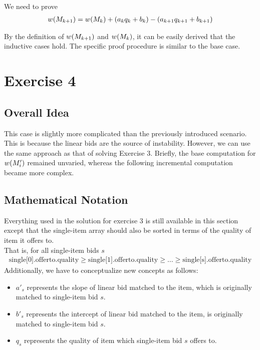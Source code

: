 \documentclass[11pt,a4paper]{article}
\begin{document}
We need to prove
\begin{align*}
    w(M_{k+1}) = w(M_{k}) + (a_{k} q_{k} + b_{k}) - (a_{k+1} q_{k+1} + b_{k+1})
\end{align*}

By the definition of $w(M_{k+1})$ and $w(M_{k})$, it can be easily derived that
the inductive cases hold. The specific proof procedure is similar to the base
case. 

\newpage
\section{Exercise 4}
\subsection{Overall Idea}
This case is slightly more complicated than the previously introduced
scenario. This is because the linear bids are the source of instability.
However, we can use the same approach as that of solving Exercise 3. Briefly,
the base computation for $w(M'_i)$ remained unvaried, whereas the following
incremental computation became more complex.

\subsection{Mathematical Notation}
Everything used in the solution for exercise 3 is still available in this
section except that the single-item array should also be sorted in terms of
the quality of item it offers to. \\
That is, for all single-item bids $s$
\begin{align*} 
    \text{single[0].offerto.quality} \geq \text{single[1].offerto.quality}
    \geq \dots \geq \text{single[s].offerto.quality}
\end{align*}
Additionally, we have to conceptualize new concepts as follows:
\begin{itemize}
    \item{$a'_s$ represents the slope of linear bid matched to the item, which
        is originally matched to single-item bid $s$.}
    \item{$b'_s$ represents the intercept of linear bid matched to the item,
            is originally matched to single-item bid $s$.}
    \item{$q_s$ represents the quality of item which
        single-item bid $s$ offers to.}
\end{itemize}
\end{document}

